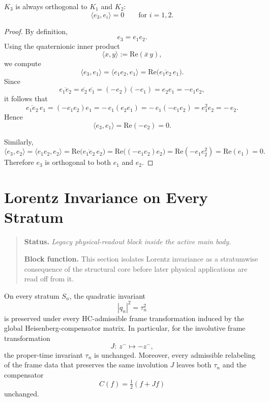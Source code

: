 \begin{proposition}
\label{prop:orthogonality-third-kernel}
$K_3$ is always orthogonal to $K_1$ and $K_2$:
\[
\langle e_3,e_i\rangle = 0 \qquad \text{for } i=1,2.
\]
\end{proposition}

\begin{proof}
By definition,
\[
e_3 = e_1 e_2.
\]
Using the quaternionic inner product
\[
\langle x,y\rangle := \mathrm{Re}(\overline{x}\,y),
\]
we compute
\[
\langle e_3,e_1\rangle
=
\langle e_1e_2,e_1\rangle
=
\mathrm{Re}\!\bigl(\overline{e_1e_2}\,e_1\bigr).
\]
Since
\[
\overline{e_1e_2}=\overline{e_2}\,\overline{e_1}=(-e_2)(-e_1)=e_2e_1=-e_1e_2,
\]
it follows that
\[
\overline{e_1e_2}\,e_1
=
(-e_1e_2)e_1
=
-\,e_1(e_2e_1)
=
-\,e_1(-e_1e_2)
=
e_1^2 e_2
=
-\,e_2.
\]
Hence
\[
\langle e_3,e_1\rangle
=
\mathrm{Re}(-e_2)=0.
\]

Similarly,
\[
\langle e_3,e_2\rangle
=
\langle e_1e_2,e_2\rangle
=
\mathrm{Re}\!\bigl(\overline{e_1e_2}\,e_2\bigr)
=
\mathrm{Re}\!\bigl((-e_1e_2)e_2\bigr)
=
\mathrm{Re}(-e_1 e_2^2)
=
\mathrm{Re}(e_1)=0.
\]
Therefore $e_3$ is orthogonal to both $e_1$ and $e_2$.
\end{proof}


\section{Lorentz Invariance on Every Stratum}
\begin{quote}\small
\noindent\textbf{Status.} \emph{Legacy physical-readout block inside the active main body.}\par
\noindent\textbf{Block function.} This section isolates Lorentz invariance as a stratumwise consequence of the structural core before later physical applications are read off from it.
\end{quote}
\label{sec:lorentz}

\begin{theorem}\label{thm:lorentz}
On every stratum $S_n$, the quadratic invariant
\[
|q_n|^2=\tau_n^2
\]
is preserved under every HC-admissible frame transformation induced by
the global Heisenberg-compensator matrix.
In particular, for the involutive frame transformation
\[
J:\ z^- \mapsto -z^-,
\]
the proper-time invariant $\tau_n$ is unchanged.
Moreover, every admissible relabeling of the frame data that preserves
the same involution $J$ leaves both $\tau_n$ and the compensator
\[
C(f)=\tfrac12(f+Jf)
\]
unchanged.
\end{theorem}

